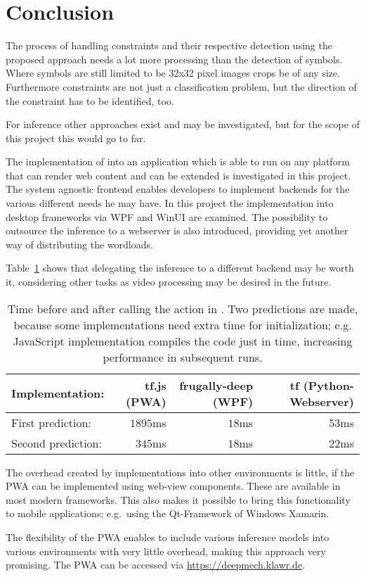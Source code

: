 \section{Conclusion}

The process of handling constraints and their respective detection using the proposed approach needs a lot more processing than the detection of symbols.
Where symbols are still limited to be 32x32 pixel images crops be of any size.
Furthermore constraints are not just a classification problem, but the direction of the constraint has to be identified, too.

For inference other approaches exist %
and may be investigated, but for the scope of this project this would go to far.

The implementation of  into an application which is able to run on any platform that can render web content and can be extended is investigated in this project.
The system agnostic frontend enables developers to implement backends for the various different needs he may have.
In this project the implementation into desktop frameworks via WPF and WinUI are examined.
The possibility to outsource the inference to a webserver is also introduced, providing yet another way of distributing the wordloads.

Table~\ref{tab:benchmarks} shows that delegating the inference to a different backend may be worth it, considering other tasks as video processing may be desired in the future.

\begin{table}
    \label{tab:benchmarks}
    \caption{
        Time before and after calling the  action in .
        Two predictions are made, because some implementations need extra time for initialization; e.g. JavaScript implementation compiles the code just in time, increasing performance in subsequent runs.}
\begin{tabular}{lrrr}
    \toprule
    Implementation: & tf.js (PWA) & frugally-deep (WPF) & tf (Python-Webserver) \\
    \midrule
    First prediction: & \(1895\)ms & \(18\)ms & \(53\)ms \\
    \midrule
    Second prediction: & \(345\)ms & \(18\)ms & \(22\)ms \\
    \bottomrule
\end{tabular}
\end{table}

The overhead created by implementations into other environments is little, if the PWA can be implemented using web-view components.
These are available in most modern frameworks.
This also makes it possible to bring this functionality to mobile applications; e.g.\ using the Qt-Framework of Windows Xamarin.

The flexibility of the PWA enables to include various inference models into various environments with very little overhead, making this approach very promising.
The PWA can be accessed via \url{https://deepmech.klawr.de}.

